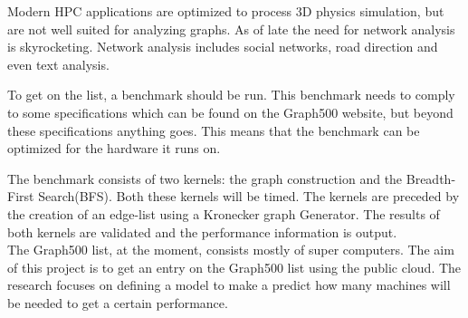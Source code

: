 Modern HPC applications are optimized to process 3D physics simulation, but are not well suited for analyzing graphs. As of late the need for network analysis is skyrocketing. Network analysis includes social networks, road direction and even text analysis. %

To get on the list, a benchmark should be run. This benchmark needs to comply to some specifications which can be found on the Graph500 website\cite{graph500-specs}, but beyond these specifications anything goes. This means that the benchmark can be optimized for the hardware it runs on. 

The benchmark consists of two kernels: the graph construction and the Breadth-First Search(BFS). Both these kernels will be timed. The kernels are preceded by the creation of an edge-list using a Kronecker graph Generator\cite{leskovec2010kronecker}. The results of both kernels are validated and the performance information is output.
\\
The Graph500 list, at the moment, consists mostly of super computers. The aim of this project is to get an entry on the Graph500 list using the public cloud. The research  focuses on defining a model to make a predict how many machines will be needed to get a certain performance.
